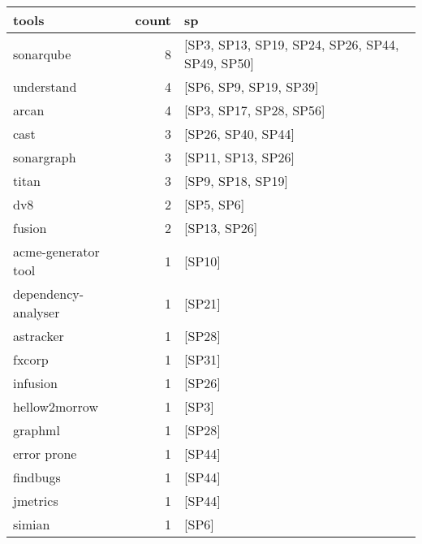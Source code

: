 \begin{tabular}{lrl}
\toprule
               tools &  count &                                                     sp \\
\midrule
           sonarqube &      8 &        [SP3, SP13, SP19, SP24, SP26, SP44, SP49, SP50] \\
          understand &      4 &                                 [SP6, SP9, SP19, SP39] \\
               arcan &      4 &                                [SP3, SP17, SP28, SP56] \\
                cast &      3 &                                     [SP26, SP40, SP44] \\
          sonargraph &      3 &                                     [SP11, SP13, SP26] \\
               titan &      3 &                                      [SP9, SP18, SP19] \\
                 dv8 &      2 &                                             [SP5, SP6] \\
              fusion &      2 &                                           [SP13, SP26] \\
 acme-generator tool &      1 &                                                 [SP10] \\
 dependency-analyser &      1 &                                                 [SP21] \\
           astracker &      1 &                                                 [SP28] \\
              fxcorp &      1 &                                                 [SP31] \\
            infusion &      1 &                                                 [SP26] \\
       hellow2morrow &      1 &                                                  [SP3] \\
             graphml &      1 &                                                 [SP28] \\
         error prone &      1 &                                                 [SP44] \\
            findbugs &      1 &                                                 [SP44] \\
            jmetrics &      1 &                                                 [SP44] \\
              simian &      1 &                                                  [SP6] \\

\end{tabular}
